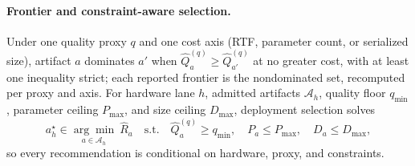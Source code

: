 \paragraph{Frontier and constraint-aware selection.}
Under one quality proxy $q$ and one cost axis (RTF, parameter count, or
serialized size), artifact $a$ dominates $a'$ when
$\widehat Q_a^{(q)}\ge\widehat Q_{a'}^{(q)}$ at no greater cost, with at
least one inequality strict; each reported frontier is the nondominated
set, recomputed per proxy and axis.  For
hardware lane $h$, admitted artifacts $\mathcal A_h$, quality floor
$q_{\min}$, parameter ceiling $P_{\max}$, and size ceiling $D_{\max}$,
deployment selection solves
\begin{equation}
  a_h^\star\in\underset{a\in\mathcal A_h}{\arg\min}\ \widehat R_a
  \quad\text{s.t.}\quad
  \widehat Q_a^{(q)}\ge q_{\min},\quad P_a\le P_{\max},\quad
  D_a\le D_{\max},
  \label{eq:constrained-selection}
\end{equation}
so every recommendation is conditional on hardware, proxy, and constraints.
